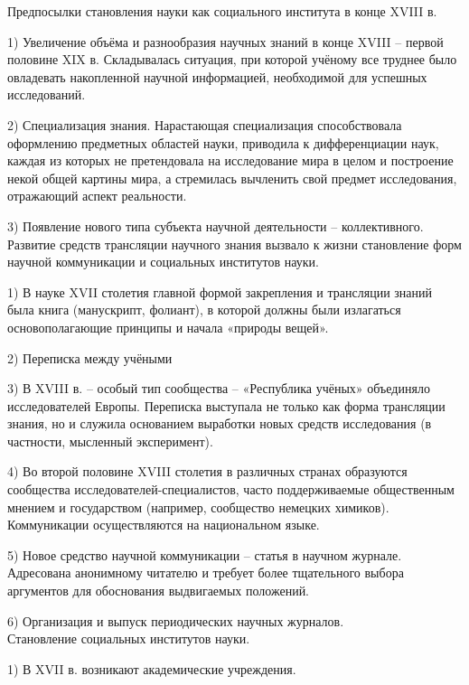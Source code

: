 \documentclass[exam_answers.tex]{subfiles}
\begin{document}
\renewcommand{\baselinestretch}{\blch}

Предпосылки становления науки как социального института в конце XVIII в.

1) Увеличение объёма и разнообразия научных знаний в конце XVIII – первой половине XIX в. Складывалась ситуация, при которой учёному все труднее было овладевать накопленной научной информацией, необходимой для успешных исследований.

2) Специализация знания. Нарастающая специализация способствовала оформлению предметных областей науки, приводила к дифференциации наук, каждая из которых не претендовала на исследование мира в целом и построение некой общей картины мира, а стремилась вычленить свой предмет исследования, отражающий аспект реальности.

3) Появление нового типа субъекта научной деятельности – коллективного.
\\

Развитие средств трансляции научного знания вызвало к жизни становление форм научной коммуникации и социальных институтов науки.

1) В науке XVII столетия главной формой закрепления и трансляции знаний была книга (манускрипт, фолиант), в которой должны были излагаться основополагающие принципы и начала «природы вещей».

2) Переписка между учёными

3) В XVIII в. – особый тип сообщества – «Республика учёных» объединяло исследователей Европы. Переписка выступала не только как форма трансляции знания, но и служила основанием выработки новых средств исследования (в частности, мысленный эксперимент).

4) Во второй половине XVIII столетия в различных странах образуются сообщества исследователей-специалистов, часто поддерживаемые общественным мнением и государством (например, сообщество немецких химиков). Коммуникации осуществляются на национальном языке.

5) Новое средство научной коммуникации – статья в научном журнале. Адресована анонимному читателю и требует более тщательного выбора аргументов для обоснования выдвигаемых положений.

6) Организация и выпуск периодических научных журналов.
\\

Становление социальных институтов науки.

1) В XVII в. возникают академические учреждения. 
\end{document}
